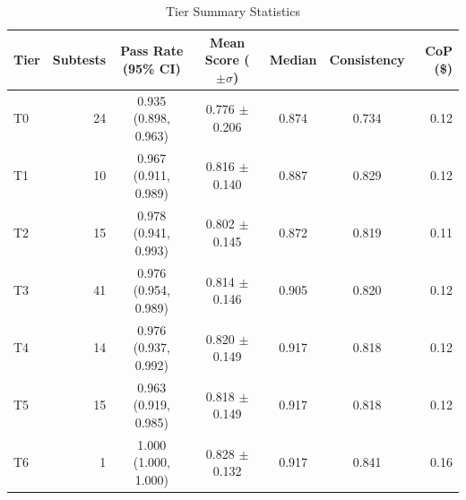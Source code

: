 \begin{table}[htbp]
\centering
\caption{Tier Summary Statistics}
\label{tab:tier_summary}
\begin{tabular}{lrccccr}
\toprule
Tier & Subtests & Pass Rate (95\% CI) & Mean Score ($\pm\sigma$) & Median & Consistency & CoP (\$) \\
\midrule
T0 & 24 & 0.935 (0.898, 0.963) & 0.776 $\pm$ 0.206 & 0.874 & 0.734 & 0.12 \\
T1 & 10 & 0.967 (0.911, 0.989) & 0.816 $\pm$ 0.140 & 0.887 & 0.829 & 0.12 \\
T2 & 15 & 0.978 (0.941, 0.993) & 0.802 $\pm$ 0.145 & 0.872 & 0.819 & 0.11 \\
T3 & 41 & 0.976 (0.954, 0.989) & 0.814 $\pm$ 0.146 & 0.905 & 0.820 & 0.12 \\
T4 & 14 & 0.976 (0.937, 0.992) & 0.820 $\pm$ 0.149 & 0.917 & 0.818 & 0.12 \\
T5 & 15 & 0.963 (0.919, 0.985) & 0.818 $\pm$ 0.149 & 0.917 & 0.818 & 0.12 \\
T6 & 1 & 1.000 (1.000, 1.000) & 0.828 $\pm$ 0.132 & 0.917 & 0.841 & 0.16 \\
\bottomrule
\end{tabular}
\end{table}